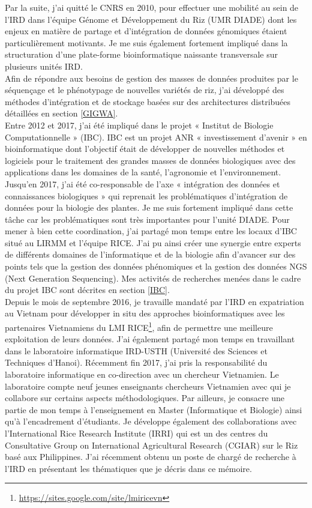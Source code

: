 Par la suite, j’ai quitté le CNRS en 2010, pour effectuer une mobilité au sein de l’IRD dans l’équipe Génome et Développement du Riz (UMR DIADE) dont les enjeux en matière de partage et d’intégration de données génomiques étaient particulièrement motivants. Je me suis également fortement impliqué dans la structuration d’une plate-forme bioinformatique naissante transversale sur plusieurs unités IRD. \\
Afin de répondre aux besoins de gestion des masses de données produites par le séquençage et le phénotypage de nouvelles variétés de riz, j’ai développé des méthodes d’intégration et de stockage basées sur des architectures distribuées détaillées en section \ref{GIGWA}. \\
Entre 2012 et 2017, j'ai été impliqué dans le projet « Institut de Biologie Computationnelle » (IBC). IBC est un projet ANR « investissement d’avenir » en bioinformatique dont l’objectif était de développer de nouvelles méthodes et logiciels pour le traitement des grandes masses de données biologiques avec des applications dans les domaines de la santé, l’agronomie et l’environnement. 
Jusqu'en 2017, j'ai été co-responsable de l’axe « intégration des données et connaissances biologiques » qui reprenait les problématiques d’intégration de données pour la biologie des plantes. Je me suis fortement impliqué dans cette tâche car les problématiques sont très importantes pour l’unité DIADE. Pour mener à bien cette coordination, j’ai partagé mon temps entre les locaux d’IBC situé au LIRMM et l’équipe RICE. J’ai pu ainsi créer une synergie entre experts de différents domaines de l’informatique et de la biologie afin d’avancer sur des points tels que la gestion des données phénomiques et la gestion des données NGS (Next Generation Sequencing). Mes activités de recherches menées dans le cadre du projet IBC sont décrites en section \ref{IBC}. \\
Depuis le mois de septembre 2016, je travaille mandaté par l'IRD en expatriation au Vietnam pour développer in situ des approches bioinformatiques avec les partenaires Vietnamiens du LMI RICE\footnote{\url{https://sites.google.com/site/lmiricevn}}, afin de permettre une meilleure exploitation de leurs données. J'ai également partagé mon temps en travaillant dans le laboratoire informatique IRD-USTH (Université des Sciences et Techniques d’Hanoi). Récemment fin 2017, j’ai pris la responsabilité du laboratoire informatique en co-direction avec un chercheur Vietnamien. Le laboratoire compte neuf jeunes enseignants chercheurs Vietnamien avec qui je collabore sur certains aspects méthodologiques. Par ailleurs, je consacre une partie de mon temps à l’enseignement en Master (Informatique et Biologie) ainsi qu’à l’encadrement d’étudiants. Je développe également des collaborations avec l’International Rice Research Institute (IRRI) qui est un des centres du Consultative Group on International Agricultural Research (CGIAR) sur le Riz basé aux Philippines.
J'ai récemment obtenu un poste de chargé de recherche à l'IRD en présentant les thématiques que je décris dans ce mémoire. \\

